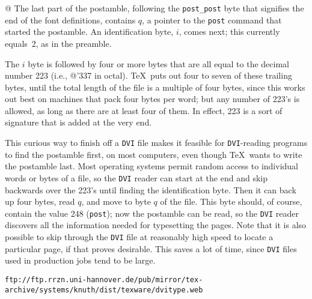 \documentclass[10pt, a4paper]{article}
\begin{document}
@ The last part of the postamble, following the \texttt{post\_post} byte 
that signifies the end of the font definitions, 
contains $q$, a pointer to the \texttt{post} command 
that started the postamble.  
An identification byte, $i$, comes next; 
this currently equals~2, as in the preamble.

The $i$ byte is followed by four or more bytes that are all equal to
the decimal number 223 (i.e., @'337 in octal). \TeX\ puts out four to seven of
these trailing bytes, until the total length of the file is a multiple of
four bytes, since this works out best on machines that pack four bytes per
word; but any number of 223's is allowed, as long as there are at least four
of them. In effect, 223 is a sort of signature that is added at the very end.


This curious way to finish off a \texttt{DVI} file makes it feasible for
\texttt{DVI}-reading programs to find the postamble first, on most computers,
even though \TeX\ wants to write the postamble last. Most operating
systems permit random access to individual words or bytes of a file, so
the \texttt{DVI} reader can start at the end and skip backwards over the 223's
until finding the identification byte. Then it can back up four bytes, read
$q$, and move to byte $q$ of the file. This byte should, of course,
contain the value 248 (\texttt{post}); now the postamble can be read, so the
\texttt{DVI} reader discovers all the information needed for typesetting the
pages. Note that it is also possible to skip through the \texttt{DVI} file at
reasonably high speed to locate a particular page, if that proves
desirable. 
This saves a lot of time, 
since \texttt{DVI} files used in production jobs tend to be large.

\begin{Verbatim}[fontsize=\scriptsize]
ftp://ftp.rrzn.uni-hannover.de/pub/mirror/tex-archive/systems/knuth/dist/texware/dvitype.web
\end{Verbatim}


{}%
\end{document}
